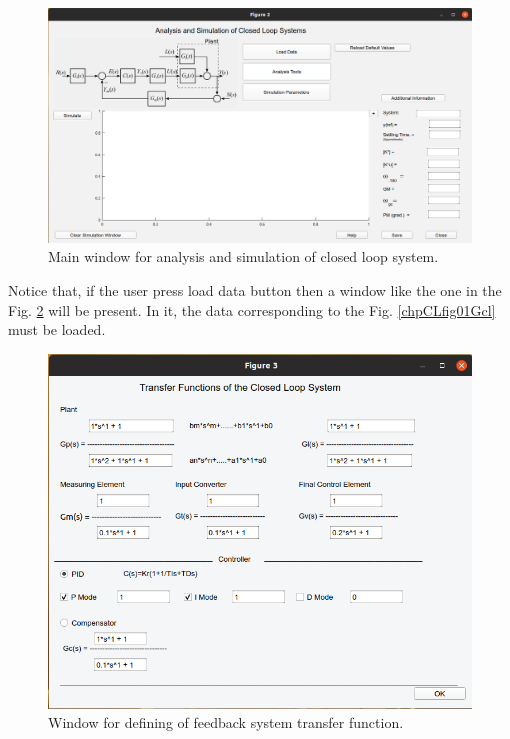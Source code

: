 \begin{figure}[H]
	\centering
	\includegraphics[scale=0.5]{./figuras/chapter_glc/fig01_ejemGcl.png}
	\caption{Main window for analysis and simulation of closed loop system.}
	\label{chp_lc_fig01_Gcl}
\end{figure}

Notice that, if the user press load data button then a window like the one in the Fig. \ref{chp_lc_fig02_Gcl} will be present. In it, the data corresponding to the Fig. \ref{chpCLfig01Gcl} must be loaded.


\begin{figure}[H]
	\centering
	\includegraphics[scale=0.5]{./figuras/chapter_glc/fig02_ejemGcl.png}
	\caption{Window for defining of feedback system transfer function.}
	\label{chp_lc_fig02_Gcl}
\end{figure}


